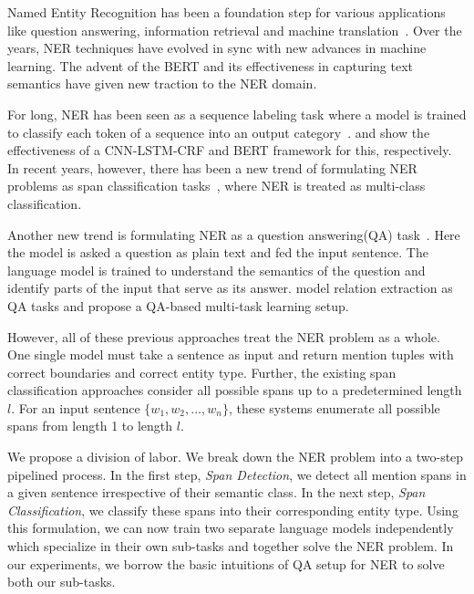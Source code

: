 
Named Entity Recognition has been %
a foundation step for various applications like question answering, information retrieval and machine translation~\cite{li2020survey}. 
Over the years, NER techniques have evolved in sync with new advances in machine learning. 
The advent of the BERT \cite{devlin2019bert} and its effectiveness in capturing text semantics have given new traction to the NER domain. 

For long, NER has been seen as a sequence labeling task where a model is trained to classify each token of a sequence into an output category~\cite{Chiu16,Lample16,ma2016end,devlin2019bert}.
\cite{ma2016end} and \cite{devlin2018bert} show the effectiveness of a CNN-LSTM-CRF and BERT framework for this, respectively. 
In recent years, however, there has been a new trend of formulating NER problems %
as span classification tasks~\cite{li2020MRC,Jiang20,Ouchi20}, 
where NER is treated as multi-class classification.

Another new trend is formulating NER as a question answering(QA) task~\cite{li2020MRC}. 
Here the model is asked a question as plain text and fed the input sentence. The language model is trained to understand the semantics of the question and identify parts of the input that serve as its answer. \cite{li2020MRC,levy2017zero} model relation extraction as QA tasks and \cite{mccann2018natural} propose a QA-based multi-task learning setup.

However, all of these previous approaches treat the NER problem as a whole. One single model must take a sentence as input and return mention tuples with correct boundaries and correct entity type. 
Further, the existing span classification approaches consider all possible spans up to a predetermined length $l$.
For an input sentence $\{w_1, w_2, \ldots, w_n\}$, these systems enumerate all possible spans from length 1 to length $l$.

We propose a division of labor. We break down the NER problem into a two-step pipelined process. In the first step, \textit{Span Detection}, we detect all mention spans in a given sentence irrespective of their semantic class. In the next step, \textit{Span Classification}, we classify these spans into their corresponding entity type. Using this formulation, we can now train two separate language models independently which specialize in their own sub-tasks and together solve the NER problem. In our experiments, we borrow the basic intuitions of QA setup for NER to solve both our sub-tasks.

